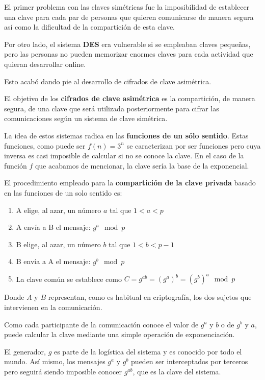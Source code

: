 \documentclass[nochap]{apuntesURJC}
\begin{document}
El primer problema con las claves simétricas fue la imposibilidad de establecer una clave para cada par de personas que quieren comunicarse de manera segura así como la dificultad de la compartición de esta clave.

Por otro lado, el sistema \textbf{DES} era vulnerable si se empleaban claves pequeñas, pero las personas no pueden memorizar enormes claves para cada actividad que quieran desarrollar online.

Esto acabó dando pie al desarrollo de cifrados de clave asimétrica.

El objetivo de los \textbf{cifrados de clave asimétrica} es la compartición, de manera segura, de una clave que será utilizada posteriormente para cifrar las comunicaciones según un sistema de clave simétrica.

La idea de estos sistemas radica en las \textbf{funciones de un sólo sentido}. Estas funciones, como puede ser $f(n)=3^n$ se caracterizan por ser funciones  pero cuya inversa es casi imposible de calcular si no se conoce la clave. En el caso de la función $f$ que acabamos de mencionar, la clave sería la base de la exponencial.

El procedimiento empleado para la \textbf{compartición de la clave privada} basado en las funciones de un solo sentido es:

\begin{enumerate}
\item A elige, al azar, un número $a$ tal que $1<a<p$
\item A envía a B el mensaje: $g^a \mod p$
\item B elige, al azar, un número $b$ tal que $1<b<p-1$
\item B envía a A el mensaje: $g^b \mod p$
\item La clave común se establece como $C=g^{ab}=(g^a)^b = (g^b)^a \mod p$
\end{enumerate}

Donde $A$ y $B$ representan, como es habitual en criptografía, los dos sujetos que intervienen en la comunicación.

Como cada participante de la comunicación conoce el valor de $g^a$ y $b$ o de $g^b$ y $a$, puede calcular la clave mediante una simple operación de exponenciación.

El generador, $g$ es parte de la logística del sistema y es conocido por todo el mundo. Así mismo, los mensajes $g^a$ y $g^b$ pueden ser interceptados por terceros pero seguirá siendo imposible conocer $g^{ab}$, que es la clave del sistema.
\end{document}
